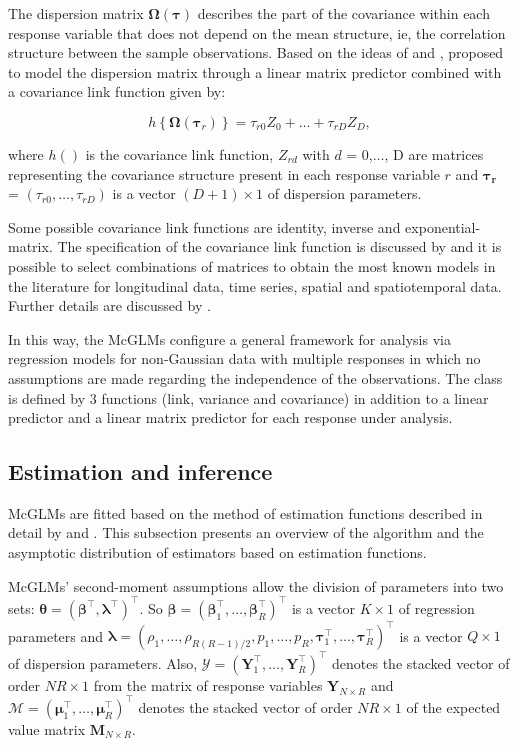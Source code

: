 \documentclass[AMA,STIX1COL]{WileyNJD-v2}
\begin{document}
The dispersion matrix $\boldsymbol{\Omega({\tau})}$ describes the part of the covariance within each response variable that does not depend on the mean structure, ie, the correlation structure between the sample observations. Based on the ideas of \cite{Anderson73} and \cite{Pourahmadi00}, \cite{Bonat16} proposed to model the dispersion matrix through a linear matrix predictor combined with a covariance link function given by:

$$
h\left \{ \boldsymbol{\Omega}(\boldsymbol{\tau}_r) \right \} = \tau_{r0}Z_0 + \ldots + \tau_{rD}Z_D,
$$

\noindent where $h()$ is the covariance link function, $Z_{rd}$ with $d$ = 0,$\ldots$, D are matrices representing the covariance structure present in each response variable $r$ and $\boldsymbol{\tau_r}$ = $(\tau_{r0}, \ldots, \tau_{rD})$ is a vector $(D + 1) \times 1$ of dispersion parameters.

Some possible covariance link functions are identity, inverse and exponential-matrix. The specification of the covariance link function is discussed by \cite{Pinheiro96} and it is possible to select combinations of matrices to obtain the most known models in the literature for longitudinal data, time series, spatial and spatiotemporal data. Further details are discussed by \cite{Demidenko13}.

In this way, the McGLMs configure a general framework for analysis via regression models for non-Gaussian data with multiple responses in which no assumptions are made regarding the independence of the observations. The class is defined by 3 functions (link, variance and covariance) in addition to a linear predictor and a linear matrix predictor for each response under analysis.

\subsection{Estimation and inference}

McGLMs are fitted based on the method of estimation functions described in detail by \cite{Bonat16} and \cite{jorg04}. This subsection presents an overview of the algorithm and the asymptotic distribution of estimators based on estimation functions.

McGLMs' second-moment assumptions allow the division of parameters into two sets: $\boldsymbol{\theta} = (\boldsymbol{\beta}^{\top}, \boldsymbol{\lambda}^{\top})^ {\top}$. So $\boldsymbol{\beta} = (\boldsymbol{\beta}_1^\top, \ldots, \boldsymbol{\beta}_R^\top)^\top$ is a vector $K \times 1$ of regression parameters and $\boldsymbol{\lambda} = (\rho_1, \ldots, \rho_{R(R-1)/2}, p_1, \ldots, p_R, \boldsymbol{\tau}_1^\top , \ldots, \boldsymbol{\tau}_R^\top)^\top$ is a vector $Q \times 1$ of dispersion parameters. Also, $\mathcal{Y} = (\boldsymbol{Y}_1^\top, \ldots, \boldsymbol{Y}_R^\top)^\top$ denotes the stacked vector of order $NR \times 1$ from the matrix of response variables $\boldsymbol{Y}_{N \times R}$ and $\mathcal{M} = (\boldsymbol{\mu}_1^\top, \ldots, \boldsymbol{\mu}_R^ \top)^\top$ denotes the stacked vector of order $NR \times 1$ of the expected value matrix $\boldsymbol{M}_{N \times R}$.
\end{document}
